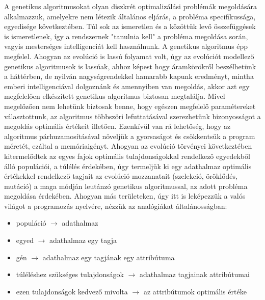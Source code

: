 \documentclass[12pt,a4paper]{report}
\begin{document}
A genetikus algoritmusokat olyan diszkrét optimalizálási problémák megoldására alkalmazzuk,
amelyekre nem létezik általános eljárás, a probléma specifikussága, egyedisége következtében.
Túl sok az ismeretlen és a közöttük levő összefüggések is ismeretlenek, így a rendszernek 
"tanulnia kell" a probléma megoldása során, vagyis mesterséges intelligenciát kell 
használnunk. A genetikus algoritmus épp megfelel. Ahogyan az evolúció is lassú folyamat volt,
úgy az evolúciót modellező genetikus algoritmusok is lassúak, ahhoz képest hogy áramkörökről
beszélhetünk a háttérben, de nyilván nagyságrendekkel hamarabb kapunk eredményt, mintha emberi
intelligenciával dolgoznánk és amennyiben van megoldás, akkor azt egy megfelelően elkészített
genetikus algoritmus biztosan megtalálja. Mivel megelőzően nem lehetünk biztosak benne, hogy
egészen megfelelő paramétereket választottunk, az algoritmus többszöri lefuttatásával 
szerezhetünk bizonyosságot a megoldás optimális értékeit illetően. Ezenkívül van rá lehetőség,
hogy az algoritmus párhuzamosításával növeljük a gyorsaságot és csökkentsük a program méretét,
ezáltal a memóriaigényt.
Ahogyan az evolúció törvényei következtében kitermelődtek az egyes fajok optimális 
tulajdonságokkal rendelkező egyedekből álló populációi, a túlélés érdekében, úgy termeljük ki
egy adathalmaz optimális értékekkel rendelkező tagjait az evolúció mozzanatait (szelekció,
öröklődés, mutáció) a maga módján leutánzó genetikus algoritmussal, az adott probléma 
megoldása érdekében. Ahogyan más területeken, úgy itt is leképezzük a valós világot a
programozás nyelvére, nézzük az analógiákat általánosságban:

\begin{itemize}
    \item populáció $\rightarrow$ adathalmaz
    \item egyed $\rightarrow$ adathalmaz egy tagja
    \item gén $\rightarrow$ adathalmaz egy tagjának egy attribútuma
    \item túléléshez szükséges tulajdonságok $\rightarrow$ adathalmaz tagjainak attribútumai
    \item ezen tulajdonságok kedvező mivolta $\rightarrow$ az attribútumok optimális értéke
\end{itemize}
\end{document}
